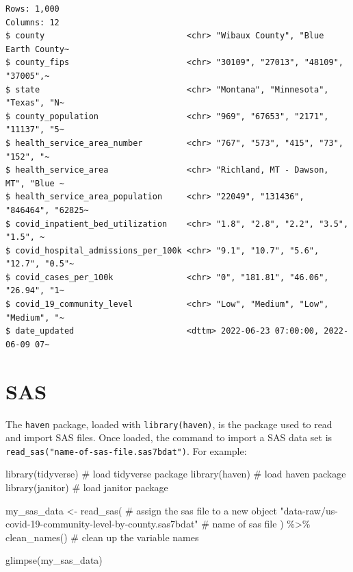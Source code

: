 \documentclass[
  letterpaper,
  DIV=11,
  numbers=noendperiod]{scrreprt}
\newenvironment{Shaded}{\begin{snugshade}}{\end{snugshade}}
\newcommand{\CommentTok}[1]{\textcolor[rgb]{0.37,0.37,0.37}{#1}}
\newcommand{\FunctionTok}[1]{\textcolor[rgb]{0.28,0.35,0.67}{#1}}
\newcommand{\NormalTok}[1]{\textcolor[rgb]{0.00,0.23,0.31}{#1}}
\newcommand{\OtherTok}[1]{\textcolor[rgb]{0.00,0.23,0.31}{#1}}
\newcommand{\SpecialCharTok}[1]{\textcolor[rgb]{0.37,0.37,0.37}{#1}}
\newcommand{\StringTok}[1]{\textcolor[rgb]{0.13,0.47,0.30}{#1}}
\begin{document}
\begin{verbatim}
Rows: 1,000
Columns: 12
$ county                             <chr> "Wibaux County", "Blue Earth County~
$ county_fips                        <chr> "30109", "27013", "48109", "37005",~
$ state                              <chr> "Montana", "Minnesota", "Texas", "N~
$ county_population                  <chr> "969", "67653", "2171", "11137", "5~
$ health_service_area_number         <chr> "767", "573", "415", "73", "152", "~
$ health_service_area                <chr> "Richland, MT - Dawson, MT", "Blue ~
$ health_service_area_population     <chr> "22049", "131436", "846464", "62825~
$ covid_inpatient_bed_utilization    <chr> "1.8", "2.8", "2.2", "3.5", "1.5", ~
$ covid_hospital_admissions_per_100k <chr> "9.1", "10.7", "5.6", "12.7", "0.5"~
$ covid_cases_per_100k               <chr> "0", "181.81", "46.06", "26.94", "1~
$ covid_19_community_level           <chr> "Low", "Medium", "Low", "Medium", "~
$ date_updated                       <dttm> 2022-06-23 07:00:00, 2022-06-09 07~
\end{verbatim}

\hypertarget{sas}{%
\section{SAS}\label{sas}}

The \texttt{haven} package, loaded with \texttt{library(haven)}, is the
package used to read and import SAS files. Once loaded, the command to
import a SAS data set is
\texttt{read\_sas("name-of-sas-file.sas7bdat")}. For example:

\begin{Shaded}
\begin{Highlighting}[]
\FunctionTok{library}\NormalTok{(tidyverse) }\CommentTok{\# load tidyverse package}
\FunctionTok{library}\NormalTok{(haven) }\CommentTok{\# load haven package}
\FunctionTok{library}\NormalTok{(janitor) }\CommentTok{\# load janitor package}

\NormalTok{my\_sas\_data }\OtherTok{\textless{}{-}} \FunctionTok{read\_sas}\NormalTok{( }\CommentTok{\# assign the sas file to a new object}
  \StringTok{"data{-}raw/us{-}covid{-}19{-}community{-}level{-}by{-}county.sas7bdat"} \CommentTok{\# name of sas file}
\NormalTok{) }\SpecialCharTok{\%\textgreater{}\%}
  \FunctionTok{clean\_names}\NormalTok{() }\CommentTok{\# clean up the variable names}

\FunctionTok{glimpse}\NormalTok{(my\_sas\_data)}
\end{Highlighting}
\end{Shaded}
\end{document}
